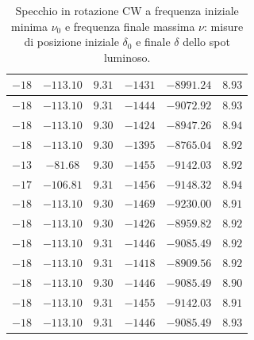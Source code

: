\documentclass[]{article}
\begin{document}
\begin{table}[H]
\begin{tabular}{||c|c|c||c|c|c||}
            $-18 $ & $-113.10 $ & $ 9.31 $ & $ -1431 $ & $ -8991.24 $ & $  8.93 $ \\\hline
            $-18 $ & $-113.10 $ & $ 9.31 $ & $ -1444 $ & $ -9072.92 $ & $  8.93 $ \\\hline
            $-18 $ & $-113.10 $ & $ 9.30 $ & $ -1424 $ & $ -8947.26 $ & $  8.94 $ \\\hline
            $-18 $ & $-113.10 $ & $ 9.30 $ & $ -1395 $ & $ -8765.04 $ & $  8.92 $ \\\hline
            $-13 $ & $-81.68  $ & $ 9.30 $ & $ -1455 $ & $ -9142.03 $ & $  8.92 $ \\\hline
            $-17 $ & $-106.81 $ & $ 9.31 $ & $ -1456 $ & $ -9148.32 $ & $  8.94 $ \\\hline
            $-18 $ & $-113.10 $ & $ 9.30 $ & $ -1469 $ & $ -9230.00 $ & $  8.91 $ \\\hline
            $-18 $ & $-113.10 $ & $ 9.30 $ & $ -1426 $ & $ -8959.82 $ & $  8.92 $ \\\hline
            $-18 $ & $-113.10 $ & $ 9.31 $ & $ -1446 $ & $ -9085.49 $ & $  8.92 $ \\\hline
            $-18 $ & $-113.10 $ & $ 9.31 $ & $ -1418 $ & $ -8909.56 $ & $  8.92 $ \\\hline
            $-18 $ & $-113.10 $ & $ 9.30 $ & $ -1446 $ & $ -9085.49 $ & $  8.90 $ \\\hline
            $-18 $ & $-113.10 $ & $ 9.31 $ & $ -1455 $ & $ -9142.03 $ & $  8.91 $ \\\hline
            $-18 $ & $-113.10 $ & $ 9.31 $ & $ -1446 $ & $ -9085.49 $ & $  8.93 $ \\\hline
        \end{tabular}
        \caption{Specchio in rotazione CW a frequenza iniziale minima $\nu_0$ e frequenza finale massima $\nu$: misure di posizione iniziale $\delta_0$ e finale $\delta$ dello spot luminoso.}
        \label{CW_min_max-delta-omega}
    \end{table}
\end{document}
